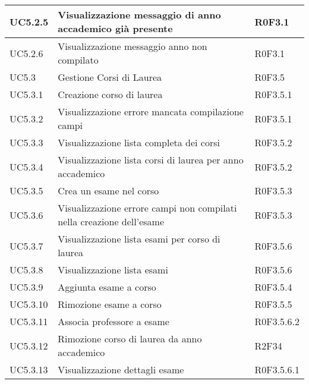 \documentclass[AnalisiDeiRequisiti.tex]{subfiles}
\begin{document}
\begin{longtable}[H]{|p{2cm}|p{5cm}|p{5cm}|}
	UC5.2.5 & Visualizzazione messaggio di anno accademico già presente & R0F3.1 \\ \hline
	UC5.2.6 & Visualizzazione messaggio anno non compilato &  R0F3.1 \\ \hline
	UC5.3 & Gestione Corsi di Laurea &  R0F3.5 \\  \hline
	UC5.3.1 & Creazione corso di laurea &  R0F3.5.1 \\ \hline
	UC5.3.2 & Visualizzazione errore mancata compilazione campi & R0F3.5.1 \\ \hline
	UC5.3.3 & Visualizzazione lista completa dei corsi &  R0F3.5.2 \\ \hline
	UC5.3.4 & Visualizzazione lista corsi di laurea per anno accademico & R0F3.5.2  \\ \hline
	UC5.3.5 & Crea un esame nel corso &  R0F3.5.3\\ \hline
	UC5.3.6 & Visualizzazione errore campi non compilati nella creazione dell'esame & R0F3.5.3  \\ \hline
	UC5.3.7 & Visualizzazione lista esami per corso di laurea & R0F3.5.6 \\ \hline
	UC5.3.8 & Visualizzazione lista esami &  R0F3.5.6 \\ \hline
	UC5.3.9 & Aggiunta esame a corso &  R0F3.5.4 \\ \hline
	UC5.3.10 & Rimozione esame a corso &  R0F3.5.5 \\ \hline
	UC5.3.11 & Associa professore a esame & R0F3.5.6.2 \\ \hline
	UC5.3.12 & Rimozione corso di laurea da anno accademico & R2F34 \\ \hline
	UC5.3.13 & Visualizzazione dettagli esame & R0F3.5.6.1 \\ \hline
	

\end{longtable}
\end{document}

